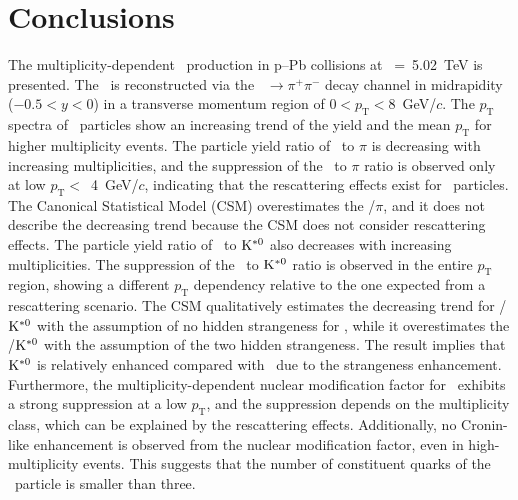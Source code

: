 
\section{Conclusions}
\label{sec:summary}

The multiplicity-dependent \fzero~production in p--Pb collisions at \snn~=~5.02~TeV is presented. The \fzero~is reconstructed via the \fzero~$\rightarrow\pi^{+}\pi^{-}$ decay channel in midrapidity ($-0.5<y<0$) in a transverse momentum region of $0<p_{\mathrm{T}}<8$~GeV/$c$. The $p_{\mathrm{T}}$ spectra of \fzero~particles show an increasing trend of the yield and the mean $p_{\mathrm{T}}$ for higher multiplicity events. The particle yield ratio of \fzero~to $\pi$ is decreasing with increasing multiplicities, and the suppression of the \fzero~to $\pi$ ratio is observed only at low $p_{\mathrm{T}}<$~4~GeV/$c$, indicating that the rescattering effects exist for \fzero~particles. The Canonical Statistical Model (CSM) overestimates the \fzero/$\pi$, and it does not describe the decreasing trend because the CSM does not consider rescattering effects. The particle yield ratio of \fzero~to $\rm{}K^{*0}$ also decreases with increasing multiplicities. The suppression of the \fzero~to $\rm{}K^{*0}$ ratio is observed in the entire $p_{\mathrm{T}}$ region, showing a different $p_{\mathrm{T}}$ dependency relative to the one expected from a rescattering scenario. The CSM qualitatively estimates the decreasing trend for \fzero/$\rm{}K^{*0}$ with the assumption of no hidden strangeness for \fzero, while it overestimates the \fzero/$\rm{}K^{*0}$ with the assumption of the two hidden strangeness. The result implies that $\rm{}K^{*0}$ is relatively enhanced compared with \fzero~due to the strangeness enhancement. Furthermore, the multiplicity-dependent nuclear modification factor for \fzero~exhibits a strong suppression at a low $p_{\mathrm{T}}$, and the suppression depends on the multiplicity class, which can be explained by the rescattering effects. Additionally, no Cronin-like enhancement is observed from the nuclear modification factor, even in high-multiplicity events. This suggests that the number of constituent quarks of the \fzero~particle is smaller than three.